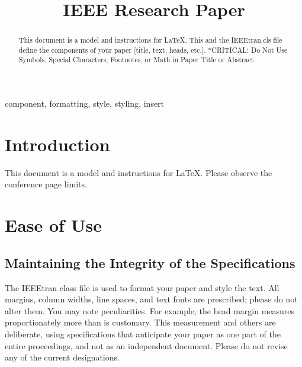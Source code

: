 \documentclass[conference]{IEEEtran}
\begin{document}
\title{IEEE Research Paper\\


}

\author{
\and
{}
\and
}
\maketitle

\begin{abstract}
This document is a model and instructions for \LaTeX.
This and the IEEEtran.cls file define the components of your paper [title, text, heads, etc.]. *CRITICAL: Do Not Use Symbols, Special Characters, Footnotes, 
or Math in Paper Title or Abstract.
\end{abstract}

\begin{IEEEkeywords}
component, formatting, style, styling, insert
\end{IEEEkeywords}

\section{Introduction}
This document is a model and instructions for \LaTeX.
Please observe the conference page limits. 

\section{Ease of Use}

\subsection{Maintaining the Integrity of the Specifications}

The IEEEtran class file is used to format your paper and style the text. All margins, 
column widths, line spaces, and text fonts are prescribed; please do not 
alter them. You may note peculiarities. For example, the head margin
measures proportionately more than is customary. This measurement 
and others are deliberate, using specifications that anticipate your paper 
as one part of the entire proceedings, and not as an independent document. 
Please do not revise any of the current designations.
\end{document}

